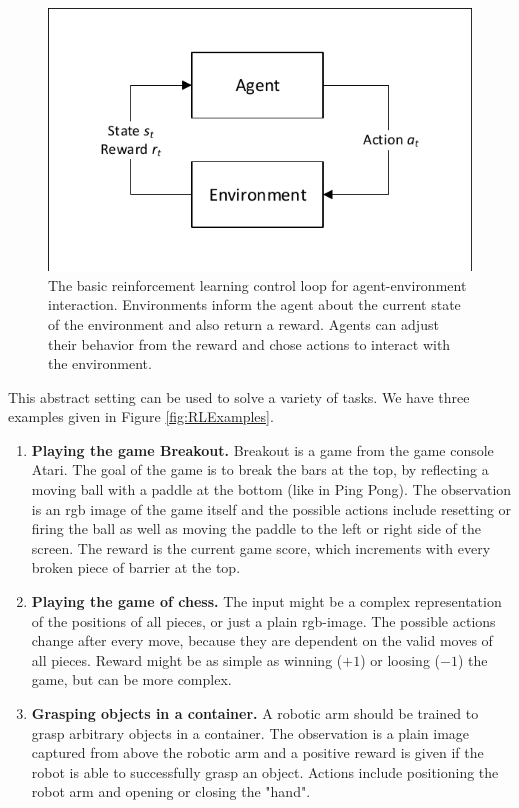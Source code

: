 \begin{figure}[ht]
    
  \begin{center}
      \includegraphics[clip, trim=10px 10px 10px 10px, width=0.6\columnwidth]{figures/rl/rl_control_loop.pdf}
  \end{center}
  
  \caption[Agent-environment interaction control loop]{The basic reinforcement learning control loop for agent-environment interaction. Environments inform the agent about the current state of the environment and also return a reward. Agents can adjust their behavior from the reward and chose actions to interact with the environment.}
  \label{fig:rl_control_loop}
\end{figure}

This abstract setting can be used to solve a variety of tasks. We have three examples given in Figure \ref{fig:RLExamples}.
\begin{enumerate}
  \item \textbf{Playing the game Breakout.} Breakout is a game from the game console Atari. The goal of the game is to break the bars at the top, by reflecting a moving ball with a paddle at the bottom (like in Ping Pong). The observation is an rgb image of the game itself and the possible actions include resetting or firing the ball as well as moving the paddle to the left or right side of the screen. The reward is the current game score, which increments with every broken piece of barrier at the top. 
  \item \textbf{Playing the game of chess.} The input might be a complex representation of the positions of all pieces, or just a plain rgb-image. The possible actions change after every move, because they are dependent on the valid moves of all pieces. Reward might be as simple as winning ($+1$) or loosing ($-1$) the game, but can be more complex.
  \item \textbf{Grasping objects in a container.} A robotic arm should be trained to grasp arbitrary objects in a container. The observation is a plain image captured from above the robotic arm and a positive reward is given if the robot is able to successfully grasp an object. Actions include positioning the robot arm and opening or closing the "hand". 
\end{enumerate}

